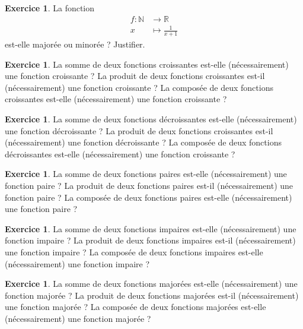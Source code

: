 \documentclass[a4paper,13pt]{scrreprt}
\theoremstyle{plain}
\theoremstyle{definition}
\newtheorem{exo}[subsection]{Exercice}
\newcommand{\nn}{\mathbb{N}}
\newcommand{\rr}{\mathbb{R}}
\begin{document}
\begin{exo} \label{exof18}
	La fonction \begin{align*}
	f : \nn &\to \rr \\
	x &\mapsto \frac{1}{x+1}
	\end{align*}
	est-elle majorée ou minorée ? Justifier.
\end{exo}

\begin{exo} \label{exof19}
	La somme de deux fonctions croissantes est-elle (nécessairement) une fonction croissante ? La produit de deux fonctions croissantes est-il (nécessairement) une fonction croissante ? La composée de deux fonctions croissantes est-elle (nécessairement) une fonction croissante ? 
\end{exo}

\begin{exo} \label{exof20}
	La somme de deux fonctions décroissantes est-elle (nécessairement) une fonction décroissante ? La produit de deux fonctions croissantes est-il (nécessairement) une fonction décroissante ? La composée de deux fonctions décroissantes est-elle (nécessairement) une fonction croissante ? 
\end{exo}

\begin{exo} \label{exof21}
	La somme de deux fonctions paires est-elle (nécessairement) une fonction paire ? La produit de deux fonctions paires est-il (nécessairement) une fonction paire ? La composée de deux fonctions paires est-elle (nécessairement) une fonction paire ? 
\end{exo}

\begin{exo} \label{exof22}
	La somme de deux fonctions impaires est-elle (nécessairement) une fonction impaire ? La produit de deux fonctions impaires est-il (nécessairement) une fonction impaire ? La composée de deux fonctions impaires est-elle (nécessairement) une fonction impaire ? 
\end{exo}

\begin{exo} \label{exof23}
	La somme de deux fonctions majorées est-elle (nécessairement) une fonction majorée ? La produit de deux fonctions majorées est-il (nécessairement) une fonction majorée ? La composée de deux fonctions majorées est-elle (nécessairement) une fonction majorée ? 
\end{exo}
\end{document}
